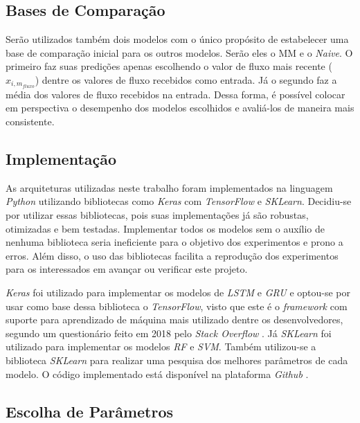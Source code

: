 \subsection{Bases de Comparação}

Serão utilizados também dois modelos com o único propósito de estabelecer uma base de comparação inicial para os outros modelos. Serão eles o \acrshort{MM} e o \textit{Naive}. O primeiro faz suas predições apenas escolhendo o valor de fluxo mais recente (\(x_{i, m_{fluxo}}\)) dentre os valores de fluxo recebidos como entrada. Já o segundo faz a média dos valores de fluxo recebidos na entrada. Dessa forma, é possível colocar em perspectiva o desempenho dos modelos escolhidos e avaliá-los de maneira mais consistente.

\subsection{Implementação}

As arquiteturas utilizadas neste trabalho foram implementados na linguagem \textit{Python} utilizando bibliotecas como \textit{Keras} com \textit{TensorFlow} e \textit{SKLearn}. Decidiu-se por utilizar essas bibliotecas, pois suas implementações já são robustas, otimizadas e bem testadas. Implementar todos os modelos sem o auxílio de nenhuma biblioteca seria ineficiente para o objetivo dos experimentos e prono a erros. Além disso, o uso das bibliotecas facilita a reprodução dos experimentos para os interessados em avançar ou verificar este projeto.

\textit{Keras} foi utilizado para implementar os modelos de \textit{\acrshort{LSTM}} e \textit{\acrshort{GRU}} e optou-se por usar como base dessa biblioteca o \textit{TensorFlow}, visto que este é o \textit{framework} com suporte para aprendizado de máquina mais utilizado dentre os desenvolvedores, segundo um questionário feito em 2018 pelo \textit{Stack Overflow} \cite{stack_2018}. Já \textit{SKLearn} foi utilizado para implementar os modelos \textit{\acrshort{RF}} e \textit{\acrshort{SVM}}. Também utilizou-se a biblioteca \textit {SKLearn} para realizar uma pesquisa dos melhores parâmetros de cada modelo. O código implementado está disponível na plataforma \textit{Github} \footnotemark.


\subsection{Escolha de Parâmetros}


